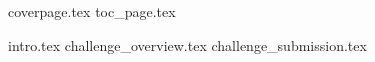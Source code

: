 \documentclass[11pt, oneside]{book}
\begin{document}

    {coverpage.tex}
    {toc_page.tex}

    {intro.tex}
    {challenge_overview.tex}
    {challenge_submission.tex}
    
\end{document}
